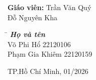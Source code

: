 \documentclass[12pt,a4paper]{article}
\begin{document}
\begin{titlepage}
\hspace{2 cm} \textbf{ Giáo viên: } Trần Văn Quý\\

\hspace{5 cm} Đỗ Nguyên Kha\\

\vskip 1cm

\begin{flushleft}
\begin{tabbing}

\hspace{2cm}
\hspace{8cm}\=\hspace{3cm}\kill
{\it\hspace{2.75cm} \textbf{Họ và tên}}\\
\hspace{3cm}Võ Phi Hổ \> \hspace{0.2cm}22120106\\
\hspace{3cm}Phạm Gia Khiêm\> \hspace{0.2cm}22120159\\

\end{tabbing}
\end{flushleft}
\vskip 2cm
\fontsize{20}{12}
\begin{center}
TP.Hồ Chí Minh, 01/2026
\end{center}
\end{titlepage}

\fancyhf{}
\cfoot{\thepage}
\rfoot{}
\lfoot{}
\pagestyle{fancy}
\renewcommand{\headrulewidth}{0pt}
\renewcommand{\footrulewidth}{0pt}

\newpage
\tableofcontents
\newpage











\end{document}
